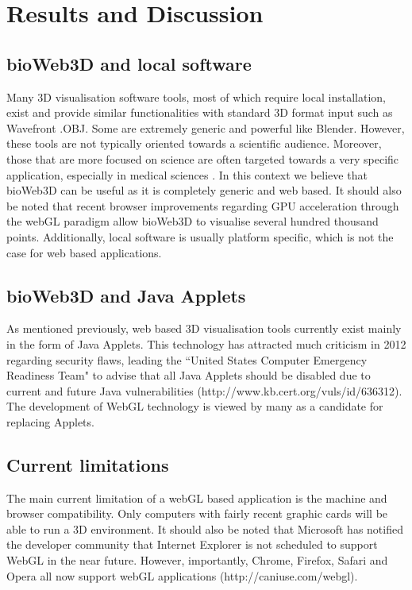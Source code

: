 \documentclass[10pt]{bmc_article}
\newenvironment{bmcformat}{\baselineskip20pt\sloppy\setboolean{publ}{false}}{\baselineskip20pt\sloppy}
\begin{document}
\begin{bmcformat}
\section{Results and Discussion}
	\subsection{bioWeb3D and local software}
Many 3D visualisation software tools, most of which require local installation, exist and provide similar functionalities with standard 3D format input such as Wavefront .OBJ. Some are extremely generic and powerful like Blender. However, these tools are not typically oriented towards a scientific audience. Moreover, those that are more focused on science are often targeted towards a very specific application, especially in medical sciences \cite{Wang09}. In this context we believe that bioWeb3D can be useful as it is completely generic and web based. It should also be noted that recent browser improvements regarding GPU acceleration through the webGL paradigm allow bioWeb3D to visualise several hundred thousand points. Additionally, local software is usually platform specific, which is not the case for web based applications.

	\subsection{bioWeb3D and Java Applets}
As mentioned previously, web based 3D visualisation tools currently exist mainly in the form of Java Applets. This technology has attracted much criticism in 2012 regarding security flaws, leading the ``United States Computer Emergency Readiness Team" to advise that all Java Applets should be disabled due to current and future Java vulnerabilities (http://www.kb.cert.org/vuls/id/636312). The development of WebGL technology is viewed by many as a candidate for replacing Applets. 

	\subsection{Current limitations}
The main current limitation of a webGL based application is the machine and browser compatibility. Only computers with fairly recent graphic cards will be able to run a 3D environment. It should also be noted that Microsoft has notified the developer community that Internet Explorer is not scheduled to support WebGL in the near future. However, importantly, Chrome, Firefox, Safari and Opera all now support webGL applications (http://caniuse.com/webgl).


\end{bmcformat}
\end{document}
